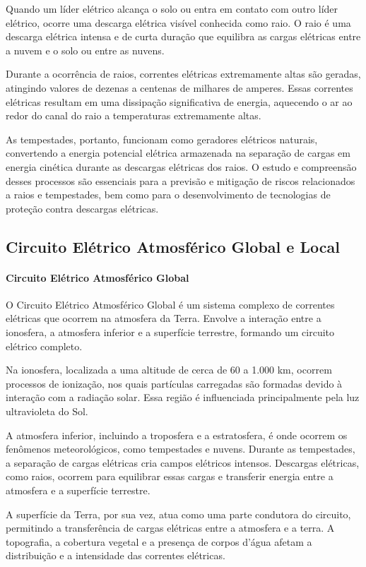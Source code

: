 \documentclass[a4paper, 12pt, onecolumn,singlespacing]{article}
\begin{document}
	Quando um líder elétrico alcança o solo ou entra em contato com outro líder elétrico, ocorre uma descarga elétrica visível conhecida como raio. O raio é uma descarga elétrica intensa e de curta duração que equilibra as cargas elétricas entre a nuvem e o solo ou entre as nuvens.
	
	Durante a ocorrência de raios, correntes elétricas extremamente altas são geradas, atingindo valores de dezenas a centenas de milhares de amperes. Essas correntes elétricas resultam em uma dissipação significativa de energia, aquecendo o ar ao redor do canal do raio a temperaturas extremamente altas.
	
	As tempestades, portanto, funcionam como geradores elétricos naturais, convertendo a energia potencial elétrica armazenada na separação de cargas em energia cinética durante as descargas elétricas dos raios. O estudo e compreensão desses processos são essenciais para a previsão e mitigação de riscos relacionados a raios e tempestades, bem como para o desenvolvimento de tecnologias de proteção contra descargas elétricas.
	
	\subsection{Circuito Elétrico Atmosférico Global e Local}
	
	\paragraph{Circuito Elétrico Atmosférico Global} O Circuito Elétrico Atmosférico Global é um sistema complexo de correntes elétricas que ocorrem na atmosfera da Terra. Envolve a interação entre a ionosfera, a atmosfera inferior e a superfície terrestre, formando um circuito elétrico completo.
	
	Na ionosfera, localizada a uma altitude de cerca de 60 a 1.000 km, ocorrem processos de ionização, nos quais partículas carregadas são formadas devido à interação com a radiação solar. Essa região é influenciada principalmente pela luz ultravioleta do Sol.
	
	A atmosfera inferior, incluindo a troposfera e a estratosfera, é onde ocorrem os fenômenos meteorológicos, como tempestades e nuvens. Durante as tempestades, a separação de cargas elétricas cria campos elétricos intensos. Descargas elétricas, como raios, ocorrem para equilibrar essas cargas e transferir energia entre a atmosfera e a superfície terrestre.
	
	A superfície da Terra, por sua vez, atua como uma parte condutora do circuito, permitindo a transferência de cargas elétricas entre a atmosfera e a terra. A topografia, a cobertura vegetal e a presença de corpos d'água afetam a distribuição e a intensidade das correntes elétricas.
	
\end{document}
